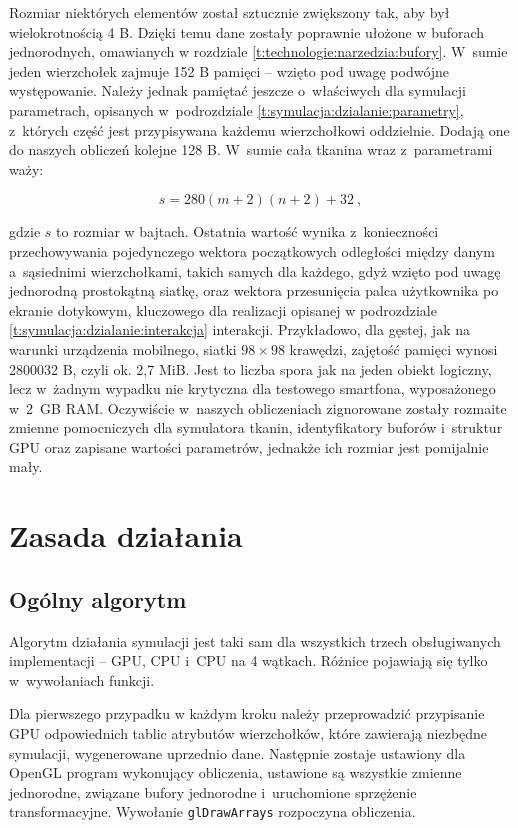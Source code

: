 	Rozmiar niektórych elementów został sztucznie zwiększony tak, aby był wielokrotnością 4 B. Dzięki temu dane zostały poprawnie ułożone w buforach jednorodnych, omawianych w rozdziale \ref{t:technologie:narzedzia:bufory}. W~sumie jeden wierzchołek zajmuje 152 B pamięci -- wzięto pod uwagę podwójne występowanie. Należy jednak pamiętać jeszcze o~właściwych dla symulacji parametrach, opisanych w~podrozdziale \ref{t:symulacja:dzialanie:parametry}, z~których część jest przypisywana każdemu wierzchołkowi oddzielnie. Dodają one do naszych obliczeń kolejne 128 B. W~sumie cała tkanina wraz z~parametrami waży:
	
	\begin{equation}
	s = 280(m + 2)(n + 2) + 32 \ ,
	\end{equation} 
	
	gdzie \(s\) to rozmiar w bajtach. Ostatnia wartość wynika z~konieczności przechowywania pojedynczego wektora początkowych odległości między danym a~sąsiednimi wierzchołkami, takich samych dla każdego, gdyż wzięto pod uwagę jednorodną prostokątną siatkę, oraz wektora przesunięcia palca użytkownika po ekranie dotykowym, kluczowego dla realizacji opisanej w podrozdziale \ref{t:symulacja:dzialanie:interakcja} interakcji. Przykładowo, dla gęstej, jak na warunki urządzenia mobilnego, siatki \( 98 \times 98 \) krawędzi, zajętość pamięci wynosi 2800032 B, czyli ok. 2,7 MiB. Jest to liczba spora jak na jeden obiekt logiczny, lecz w~żadnym wypadku nie krytyczna dla testowego smartfona, wyposażonego w~2~GB RAM. Oczywiście w~naszych obliczeniach zignorowane zostały rozmaite zmienne pomocniczych dla symulatora tkanin, identyfikatory buforów i~struktur GPU oraz zapisane wartości parametrów, jednakże ich rozmiar jest pomijalnie mały.
	
	\section{Zasada działania}
	\label{t:symulacja:dzialanie}
	
		\subsection{Ogólny algorytm}
		\label{t:symulacja:dzialanie:algorytm}
		
		Algorytm działania symulacji jest taki sam dla wszystkich trzech obsługiwanych implementacji -- GPU, CPU i~CPU na 4 wątkach. Różnice pojawiają się tylko w~wywołaniach funkcji. 
		
		Dla pierwszego przypadku w każdym kroku należy przeprowadzić przypisanie GPU odpowiednich tablic atrybutów wierzchołków, które zawierają niezbędne symulacji, wygenerowane uprzednio dane. Następnie zostaje ustawiony dla OpenGL program wykonujący obliczenia, ustawione są wszystkie zmienne jednorodne, związane bufory jednorodne i~uruchomione sprzężenie transformacyjne. Wywołanie \texttt{glDrawArrays} rozpoczyna obliczenia. 
		
